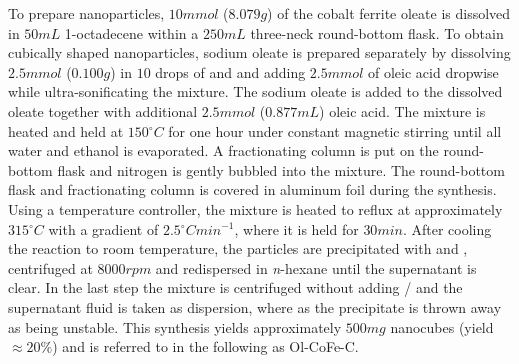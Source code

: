 \documentclass[\main/dresen_thesis.tex]{subfiles}
\begin{document}
    To prepare nanoparticles, $10 \unit{mmol}$ ($8.079 \unit{g}$) of the cobalt ferrite oleate is dissolved in $50 \unit{mL}$ 1-octadecene within a $250 \unit{mL}$ three-neck round-bottom flask.
    To obtain cubically shaped nanoparticles, sodium oleate is prepared separately by dissolving $2.5 \unit{mmol}$ ($0.100 \unit{g}$)  in $10$ drops of  and  and adding $2.5 \unit{mmol}$ of oleic acid dropwise while ultra-sonificating the mixture.
    The sodium oleate is added to the dissolved oleate together with additional $2.5 \unit{mmol}$ ($0.877 \unit{mL}$) oleic acid.
    The mixture is heated and held at $150 \unit{^\circ C}$ for one hour under constant magnetic stirring until all water and ethanol is evaporated.
    A fractionating column is put on the round-bottom flask and nitrogen is gently bubbled into the mixture.
    The round-bottom flask and fractionating column is covered in aluminum foil during the synthesis.
    Using a temperature controller, the mixture is heated to reflux at approximately $315 \unit{^\circ C}$ with a gradient of $2.5 \unit{^\circ C min^{-1}}$, where it is held for $30 \unit{min}$.
    After cooling the reaction to room temperature, the particles are precipitated with  and , centrifuged at $8000 \unit{rpm}$ and redispersed in \textit{n}-hexane until the supernatant is clear.
    In the last step the mixture is centrifuged without adding / and the supernatant fluid is taken as dispersion, where as the precipitate is thrown away as being unstable.
    This synthesis yields approximately $500 \unit{mg}$ nanocubes (yield $\approx 20 \%$) and is referred to in the following as Ol-CoFe-C.
\end{document}
